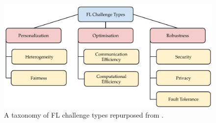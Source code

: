 \begin{figure}[htbp]
  \centering
  \includegraphics[width=\textwidth]{figures/fl_challenge_types_taxonomy.pdf}
  \caption{A taxonomy of FL challenge types repurposed from \cite{fl_taxonomy_2024}.}
  \label{fig:fl_challenge_types_taxonomy}
\end{figure}